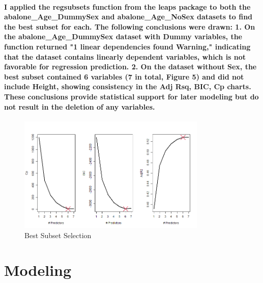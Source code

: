 \documentclass[11pt]{article} %
\begin{document}
\paragraph{I applied the regsubsets function from the leaps package to both the abalone\_Age\_DummySex and abalone\_Age\_NoSex datasets to find the best subset for each. The following conclusions were drawn: 1. On the abalone\_Age\_DummySex dataset with Dummy variables, the function returned "1 linear dependencies found Warning," indicating that the dataset contains linearly dependent variables, which is not favorable for regression prediction. 2. On the dataset without Sex, the best subset contained 6 variables (7 in total, Figure 5) and did not include Height, showing consistency in the Adj Rsq, BIC, Cp charts. These conclusions provide statistical support for later modeling but do not result in the deletion of any variables.
}
% 
% 
\begin{figure}[H]
    \centering
    \includegraphics[width=0.8\textwidth]{Pic/BSS.png}
    \caption{Best Subset Selection}
\end{figure}
% 
% 
\section{Modeling}
\end{document}
